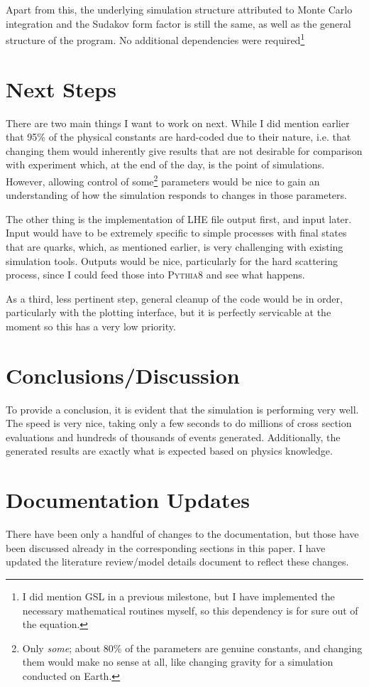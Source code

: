 Apart from this, the underlying simulation structure attributed to Monte Carlo integration and the Sudakov form factor is still the same, as well as the general structure of the program. No additional dependencies were required\footnote{I did mention GSL in a previous milestone, but I have implemented the necessary mathematical routines myself, so this dependency is for sure out of the equation.}

\section{Next Steps}

There are two main things I want to work on next. While I did mention earlier that 95\% of the physical constants are hard-coded due to their nature, i.e. that changing them would inherently give results that are not desirable for comparison with experiment which, at the end of the day, is the point of simulations. However, allowing control of some\footnote{Only \textit{some}; about 80\% of the parameters are genuine constants, and changing them would make no sense at all, like changing gravity for a simulation conducted on Earth.} parameters would be nice to gain an understanding of how the simulation responds to changes in those parameters.

The other thing is the implementation of LHE file output first, and input later. Input would have to be extremely specific to simple processes with final states that are quarks, which, as mentioned earlier, is very challenging with existing simulation tools. Outputs would be nice, particularly for the hard scattering process, since I could feed those into \textsc{Pythia8} and see what happens.

As a third, less pertinent step, general cleanup of the code would be in order, particularly with the plotting interface, but it is perfectly servicable at the moment so this has a very low priority.



\section{Conclusions/Discussion}

To provide a conclusion, it is evident that the simulation is performing very well. The speed is very nice, taking only a few seconds to do millions of cross section evaluations and hundreds of thousands of events generated. Additionally, the generated results are exactly what is expected based on physics knowledge.


\section{Documentation Updates}

There have been only a handful of changes to the documentation, but those have been discussed already in the corresponding sections in this paper. I have updated the literature review/model details document to reflect these changes.







